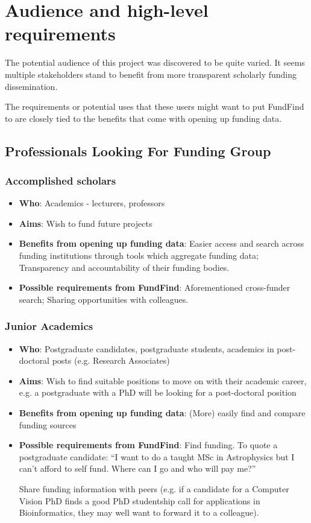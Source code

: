 \section{Audience and high-level requirements}
\label{audience}
The potential audience of this project was discovered to be quite varied. It seems multiple stakeholders stand to benefit from more transparent scholarly funding dissemination.

The requirements or potential uses that these users might want to put FundFind to are closely tied to the benefits that come with opening up funding data.

\subsection{Professionals Looking For Funding Group}
\label{audience-professionals}
\subsubsection{Accomplished scholars}
\begin{itemize}
 \item \textbf{Who}: Academics - lecturers, professors
 \item \textbf{Aims}: Wish to fund future projects
 \item \textbf{Benefits from opening up funding data}: Easier access and search across funding institutions through tools which aggregate funding data; Transparency and accountability of their funding bodies.
 \item \textbf{Possible requirements from FundFind}: Aforementioned cross-funder search; Sharing opportunities with colleagues.
\end{itemize}

\subsubsection{Junior Academics}
\begin{itemize}
 \item \textbf{Who}: Postgraduate candidates, postgraduate students, academics in post-doctoral posts (e.g. Research Associates)
 \item \textbf{Aims}: Wish to find suitable positions to move on with their academic career, e.g. a postgraduate with a PhD will be looking for a post-doctoral position
 \item \textbf{Benefits from opening up funding data}: (More) easily find and compare funding sources
 \item \textbf{Possible requirements from FundFind}: Find funding. To quote a postgraduate candidate: ``I want to do a taught MSc in Astrophysics but I can't afford to self fund. Where can I go and who will pay me?''
 
 Share funding information with peers (e.g. if a candidate for a Computer Vision PhD finds a good PhD studentship call for applications in Bioinformatics, they may well want to forward it to a colleague).
\end{itemize}

